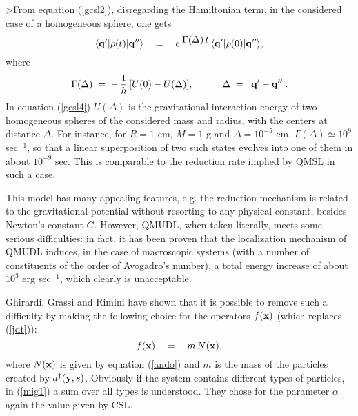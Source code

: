 \documentclass[12pt]{article}
\begin{document}
>From equation (\ref{gcsl2}), disregarding the Hamiltonian term, in
the considered case of a homogeneous sphere, one gets
\begin{equation} \label{gcsl3}
\langle {\bf q}'| \rho(t) |{\bf q}''\rangle \quad = \quad e^{\;
\displaystyle \Gamma(\Delta)\, t}\, \langle {\bf q}'| \rho(0)
|{\bf q}''\rangle,
\end{equation}
where
\begin{equation} \label{gcsl4}
\Gamma(\Delta) \; = \; -\, \frac{1}{\hbar}\, [U(0) - U(\Delta)],
\qquad\quad \Delta \; = \; |{\bf q}' - {\bf q}''|.
\end{equation}
In equation (\ref{gcsl4}) $U(\Delta)$ is the gravitational
interaction energy of two homogeneous spheres of the considered
mass and radius, with the centers at distance $\Delta$. For
instance, for $R = 1$ cm, $M = 1$ g and $\Delta = 10^{-5}$ cm,
$\Gamma(\Delta) \simeq 10^{9}$ sec$^{-1}$, so that a linear
superposition of two such states evolves into one of them in about
$10^{-9}$ sec.  This is comparable to the reduction rate implied by QMSL
in such a case.

This model has many appealing features, e.g. the reduction
mechanism is related to the gravitational potential without
resorting to any physical constant, besides Newton's constant $G$.
However, QMUDL, when taken literally, meets some serious
difficulties: in fact, it has been proven \cite{ggrg} that the
localization mechanism of QMUDL induces, in the case of
macroscopic systems (with a number of constituents of the order of
Avogadro's number), a total energy increase of about $10^{3}$ erg
sec${}^{-1}$, which clearly is unacceptable.

Ghirardi, Grassi and Rimini \cite{ggrg} have shown that it is
possible to remove such a difficulty by making the following
choice for the operators $f({\bf x})$ (which replaces
(\ref{jdt})):
\begin{equation} \label{mig1}
f({\bf x}) \quad = \quad m\, N({\bf x}),
\end{equation}
where $N({\bf x})$ is given by equation (\ref{ando}) and $m$ is
the mass of the particles created by $a^{\dagger}({\bf y},s)$.
Obviously if the system contains different types of particles, in
(\ref{mig1}) a sum over all types is understood. They chose for
the parameter $\alpha$ again the value given by CSL.
\end{document}
